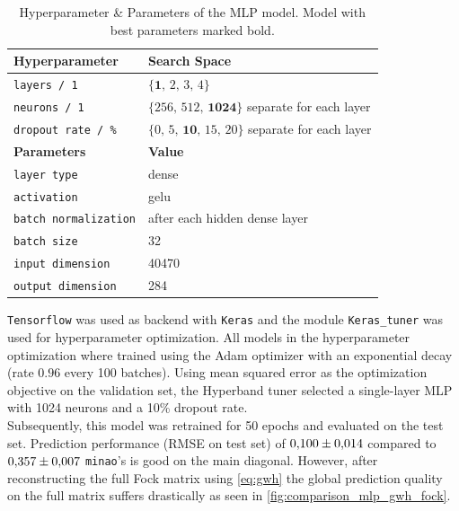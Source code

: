 \begin{table}[h]
    \caption[Hyperparameter \& Parameters of the MLP model]{Hyperparameter \& Parameters of the MLP model. Model with best parameters marked bold.}
    \label{tab:hyperparams_mlp}
    \centering
    \begin{tabular}{@{}ll@{}}
        \toprule
        \textbf{Hyperparameter}     & \textbf{Search Space}                  \\ 
        \midrule
        \texttt{layers / 1}          & $\{\textbf{1},\,2,\,3,\,4\}$                         \\
        \texttt{neurons / 1}   & $\{256,\,512,\,\textbf{1024}\}$  separate for each layer    \\
        \texttt{dropout rate / \%}   & $\{0,\,5,\,\textbf{10},\,15,\,20\}$ separate for each layer \\
        \bottomrule
        \textbf{Parameters}     & \textbf{Value}                  \\ 
        \midrule
        \texttt{layer type}          & dense                         \\
        \texttt{activation}          & gelu                         \\
        \texttt{batch normalization} & after each hidden dense layer \\
        \texttt{batch size}          & 32 \\
        \texttt{input dimension}     & 40470 \\
        \texttt{output dimension}    & 284 \\
        \bottomrule
    \end{tabular}
\end{table}

\texttt{Tensorflow} was used as backend with \texttt{Keras} and the module \texttt{Keras\_tuner} was used for hyperparameter optimization. \parencite{ref:tensorflow,ref:keras,ref:kerastuner}
All models in the hyperparameter optimization where trained using the Adam optimizer with an exponential decay (rate $0.96$ every 100 batches). Using mean squared error as the optimization objective on the validation set, the Hyperband tuner selected a single-layer MLP with 1024 neurons and a 10\% dropout rate.\\
Subsequently, this model was retrained for 50 epochs and evaluated on the test set. Prediction performance (RMSE on test set) of $\num{0.1 \pm 0.014}$ compared to $\num{0.357 \pm 0.007}$ \texttt{minao}'s is good on the main diagonal. However, after reconstructing the full Fock matrix using \autoref{eq:gwh} the global prediction quality on the full matrix suffers drastically as seen in \autoref{fig:comparison_mlp_gwh_fock}. 

